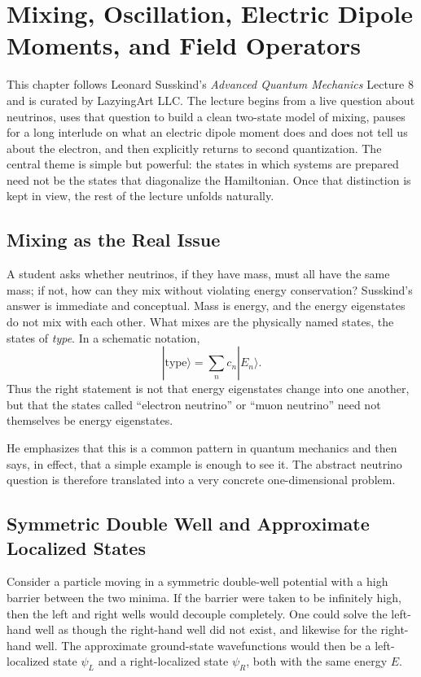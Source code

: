 \chapter{Mixing, Oscillation, Electric Dipole Moments, and Field Operators}

This chapter follows Leonard Susskind's \emph{Advanced Quantum Mechanics} Lecture 8 and is curated by LazyingArt LLC. The lecture begins from a live question about neutrinos, uses that question to build a clean two-state model of mixing, pauses for a long interlude on what an electric dipole moment does and does not tell us about the electron, and then explicitly returns to second quantization. The central theme is simple but powerful: the states in which systems are prepared need not be the states that diagonalize the Hamiltonian. Once that distinction is kept in view, the rest of the lecture unfolds naturally.

\section{Mixing as the Real Issue}

A student asks whether neutrinos, if they have mass, must all have the same mass; if not, how can they mix without violating energy conservation? Susskind's answer is immediate and conceptual. Mass is energy, and the energy eigenstates do not mix with each other. What mixes are the physically named states, the states of \emph{type}. In a schematic notation,
\begin{equation}
|\text{type}\rangle = \sum_n c_n |E_n\rangle .
\end{equation}
Thus the right statement is not that energy eigenstates change into one another, but that the states called ``electron neutrino'' or ``muon neutrino'' need not themselves be energy eigenstates.

He emphasizes that this is a common pattern in quantum mechanics and then says, in effect, that a simple example is enough to see it. The abstract neutrino question is therefore translated into a very concrete one-dimensional problem.

\section{Symmetric Double Well and Approximate Localized States}

Consider a particle moving in a symmetric double-well potential with a high barrier between the two minima. If the barrier were taken to be infinitely high, then the left and right wells would decouple completely. One could solve the left-hand well as though the right-hand well did not exist, and likewise for the right-hand well. The approximate ground-state wavefunctions would then be a left-localized state \(\psi_L\) and a right-localized state \(\psi_R\), both with the same energy \(E\).

